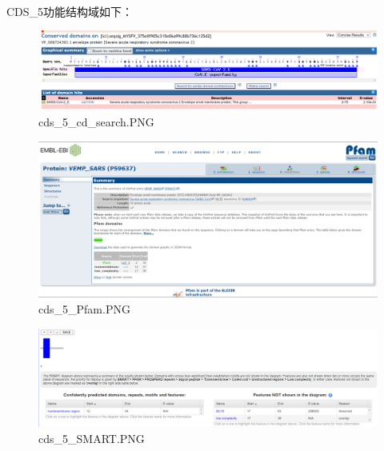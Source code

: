 \documentclass[supercite]{HustGraduPaper}
\begin{document}
	\paragraph{}\label{subpara:subpara}CDS\_5功能结构域如下：
	\begin{figure}[H]
		\centering
		\includegraphics[width=1\textwidth]{./material/practice2/cds_5/cd_search.png}
		\caption{cds\_5\_cd\_search.PNG}
	\end{figure}
	\begin{figure}[H]
		\centering
		\includegraphics[width=1\textwidth]{./material/practice2/cds_5/Pfam.png}
		\caption{cds\_5\_Pfam.PNG}
	\end{figure}
	\begin{figure}[H]
		\centering
		\includegraphics[width=1\textwidth]{./material/practice2/cds_5/SMART.png}
		\caption{cds\_5\_SMART.PNG}
	\end{figure}
\end{document}
